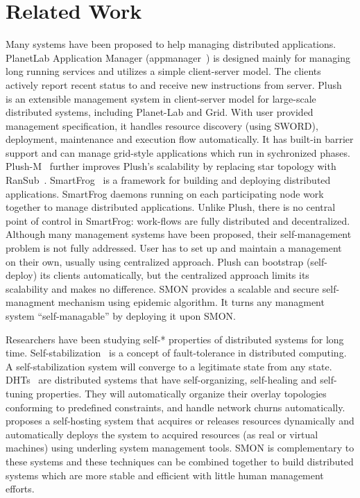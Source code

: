 \section{Related Work}
\label{sec:related}

Many systems have been proposed to help managing distributed
applications.
PlanetLab Application Manager (appmanager~\cite{appmanager})
is designed mainly for managing long running services and
utilizes a simple client-server model. The clients actively
report recent status to and receive new instructions from
server.  Plush~\cite{Albrecht2007} is an extensible
management system in client-server model for large-scale
distributed systems, including Planet-Lab and Grid. With
user provided management specification, it handles resource
discovery (using SWORD), deployment, maintenance and
execution flow automatically. It has built-in barrier
support and can manage grid-style applications which run in
sychronized phases.  Plush-M~\cite{Topilski2008} further
improves Plush's scalability by replacing star topology with
RanSub~\cite{Kostic2003}.  SmartFrog~\cite{smartfrog} is a
framework for building and deploying distributed
applications. SmartFrog daemons running on each
participating node work together to manage distributed
applications. Unlike Plush, there is no central point of
control in SmartFrog: work-flows are fully distributed and
decentralized.  Although many management systems have been
proposed, their self-management problem is not fully
addressed.  User has to set up and maintain a management on
their own, usually using centralized approach. Plush can
bootstrap (self-deploy) its clients automatically, but the
centralized approach limits its scalability and makes no
difference.  SMON provides a scalable and secure
self-managment mechanism using epidemic algorithm. It turns
any managment system ``self-managable'' by deploying it upon
SMON.

Researchers have been studying self-* properties of
distributed systems for long time.
Self-stabilization~\cite{Dijkstra1974} is a concept of
fault-tolerance in distributed computing. A
self-stabilization system will converge to a legitimate
state from any state. DHTs~\cite{Stoica2001, Ratnasamy2001,
Rowstron2001} are distributed systems that have
self-organizing, self-healing and self-tuning properties.
They will automatically organize their overlay topologies
conforming to predefined constraints, and handle network
churns automatically. \cite{Yin2008} proposes a self-hosting
system that acquires or releases resources dynamically and
automatically deploys the system to acquired resources (as
real or virtual machines) using underling system management
tools. SMON is complementary to these systems and these
techniques can be combined together to build distributed
systems which are more stable and efficient with little
human management efforts.

